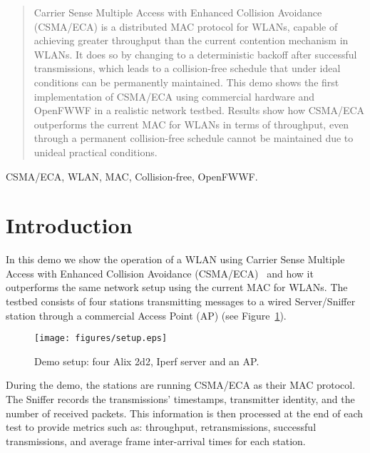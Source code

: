 \documentclass[conference]{IEEEtran}
\begin{document}
\begin{abstract}
Carrier Sense Multiple Access with Enhanced Collision Avoidance (CSMA/ECA) is a distributed MAC protocol for WLANs, capable of achieving greater throughput than the current contention mechanism in WLANs. It does so by changing to a deterministic backoff after successful transmissions, which leads to a collision-free schedule that under ideal conditions can be permanently maintained. This demo shows the first implementation of CSMA/ECA using commercial hardware and OpenFWWF in a realistic network testbed. Results show how CSMA/ECA outperforms the current MAC for WLANs in terms of throughput, even through a permanent collision-free schedule cannot be maintained due to unideal practical conditions. 


\end{abstract}

\begin{IEEEkeywords}
CSMA/ECA, WLAN, MAC, Collision-free, OpenFWWF.
\end{IEEEkeywords}

\maketitle

\section{Introduction}\label{intro}
In this demo we show the operation of a WLAN using Carrier Sense Multiple Access with Enhanced Collision Avoidance (CSMA/ECA)~\cite{barcelo2008lba} and how it outperforms the same network setup using the current MAC for WLANs. The testbed consists of four stations transmitting messages to a wired Server/Sniffer station through a commercial Access Point (AP) (see Figure~\ref{fig:setup}). 

	\begin{figure}[htbp]
		\centering
		\texttt{[image: figures/setup.eps]}
		\caption{Demo setup: four Alix 2d2, Iperf server and an AP.}
		\label{fig:setup}
	\end{figure}

During the demo, the stations are running CSMA/ECA as their MAC protocol. The Sniffer records the transmissions' timestamps, transmitter identity, and the number of received packets. This information is then processed at the end of each test to provide metrics such as: throughput, retransmissions, successful transmissions, and average frame inter-arrival times for each station.
\end{document}
